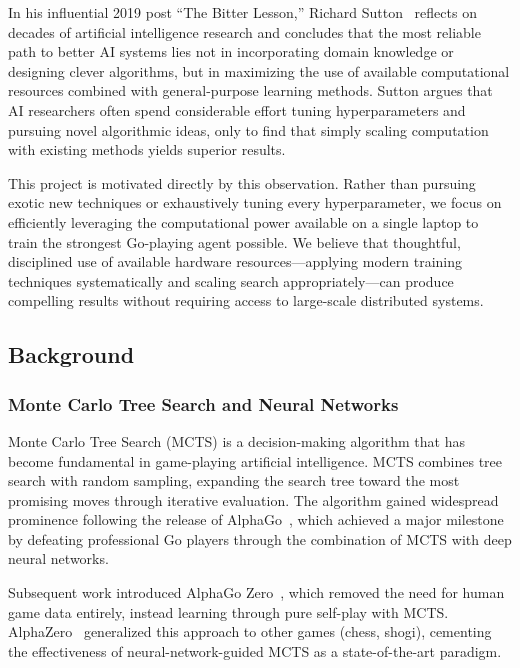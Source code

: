 \documentclass[12pt]{article}
\begin{document}
In his influential 2019 post ``The Bitter Lesson,'' Richard Sutton~\cite{sutton2019} reflects on decades of artificial intelligence research and concludes that the most reliable path to better AI systems lies not in incorporating domain knowledge or designing clever algorithms, but in maximizing the use of available computational resources combined with general-purpose learning methods. Sutton argues that AI researchers often spend considerable effort tuning hyperparameters and pursuing novel algorithmic ideas, only to find that simply scaling computation with existing methods yields superior results.

This project is motivated directly by this observation. Rather than pursuing exotic new techniques or exhaustively tuning every hyperparameter, we focus on efficiently leveraging the computational power available on a single laptop to train the strongest Go-playing agent possible. We believe that thoughtful, disciplined use of available hardware resources—applying modern training techniques systematically and scaling search appropriately—can produce compelling results without requiring access to large-scale distributed systems.

\subsection{Background}

\subsubsection{Monte Carlo Tree Search and Neural Networks}

Monte Carlo Tree Search (MCTS) is a decision-making algorithm that has become fundamental in game-playing artificial intelligence. MCTS combines tree search with random sampling, expanding the search tree toward the most promising moves through iterative evaluation. The algorithm gained widespread prominence following the release of AlphaGo~\cite{silver2016}, which achieved a major milestone by defeating professional Go players through the combination of MCTS with deep neural networks.

Subsequent work introduced AlphaGo Zero~\cite{silverzero2017}, which removed the need for human game data entirely, instead learning through pure self-play with MCTS. AlphaZero~\cite{silveralphazero2018} generalized this approach to other games (chess, shogi), cementing the effectiveness of neural-network-guided MCTS as a state-of-the-art paradigm.
\end{document}
